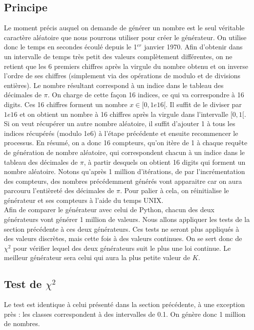 \documentclass[10pt,a4paper]{article}
\begin{document}
\subsection{Principe}
Le moment précis auquel on demande de générer un nombre est le seul véritable caractère aléatoire que nous pourrons utiliser pour créer le générateur. On utilise donc le temps en secondes écoulé depuis le 1$^{er}$ janvier 1970. Afin d'obtenir dans un intervalle de temps très petit des valeurs complètement différentes, on ne retient que les 6 premiers chiffres après la virgule du nombre obtenu et on inverse l'ordre de ses chiffres (simplement via des opérations de modulo et de divisions entières). Le nombre résultant correspond à un indice dans le tableau des décimales de $\pi$. On charge de cette façon 16 indices, ce qui va correspondre à 16 digits. Ces 16 chiffres forment un nombre $x \in [0, 1e16[$. Il suffit de le diviser par $1e16$ et on obtient un nombre à 16 chiffres après la virgule dans l'intervalle $[0, 1[$. Si on veut récupérer un autre nombre aléatoire, il suffit d'ajouter 1 à tous les indices récupérés (modulo 1e6) à l'étape précédente et ensuite recommencer le processus. En résumé, on a donc 16 compteurs, qu'on itère de 1 à chaque requête de génération de nombre aléatoire, qui correspondent chacun à un indice dans le tableau des décimales de $\pi$, à partir desquels on obtient 16 digits qui forment un nombre aléatoire. Notons qu'après 1 million d'itérations, de par l'incrémentation des compteurs, des nombres précédemment générés vont apparaitre car on aura parcouru l'entièreté des décimales de $\pi$. Pour palier à cela, on réinitialise le générateur et ses compteurs à l'aide du temps UNIX.\\

Afin de comparer le générateur avec celui de Python, chacun des deux générateurs vont générer 1 million de valeurs. Nous allons appliquer les tests de la section précédente à ces deux générateurs. Ces tests ne seront plus appliqués à des valeurs discrètes, mais cette fois à des valeurs continues. On se sert donc de $\chi^2$ pour vérifier lequel des deux générateurs suit le plus une loi continue. Le meilleur générateur sera celui qui aura la plus petite valeur de $K$.

\subsection{Test de $\chi^2$}

Le test est identique à celui présenté dans la section précédente, à une exception près : les classes correspondent à des intervalles de 0.1. On génère donc 1 million de nombres.
\end{document}
